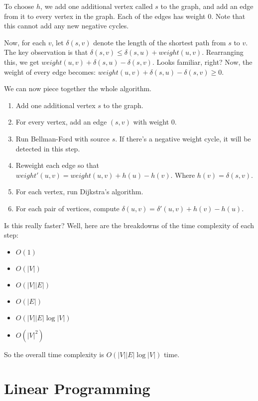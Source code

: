 \documentclass[11pt,fleqn,a4paper,titlepage,dvipsnames,cmyk]{scrartcl}
\begin{document}
To choose $h$, we add one additional vertex called $s$ to the graph, and
add an edge from it to every vertex in the graph. Each of the edges has
weight 0. Note that this cannot add any new negative cycles.

Now, for each $v$, let $\delta(s,v)$ denote the length of the shortest
path from $s$ to $v$. The key observation is that $\delta(s,v) \le
\delta(s,u) + weight(u,v)$. Rearranging this, we get $weight(u,v) +
\delta(s,u) - \delta(s,v)$. Looks familiar, right? Now, the weight of
every edge becomes: $weight(u,v) + \delta(s,u) - \delta(s,v) \ge 0$.

We can now piece together the whole algorithm.

\begin{enumerate}
    \item Add one additional vertex $s$ to the graph.
    \item For every vertex, add an edge $(s,v)$ with weight 0.
    \item Run Bellman-Ford with source $s$. If there's a negative weight
        cycle, it will be detected in this step.
    \item Reweight each edge so that $weight'(u,v) = weight(u,v) + h(u) -
        h(v)$. Where $h(v) = \delta(s,v)$.
    \item For each vertex, run Dijkstra's algorithm.
    \item For each pair of vertices, compute $\delta(u,v) = \delta'(u,v) +
        h(v) - h(u)$.
\end{enumerate}

Is this really faster? Well, here are the breakdowns of the time
complexity of each step:

\begin{itemize}
    \item $O(1)$
    \item $O(|V|)$
    \item $O(|V||E|)$
    \item $O(|E|)$
    \item $O(|V||E|\log|V|)$
    \item $O(|V|^2)$
\end{itemize}

So the overall time complexity is $O(|V||E|\log|V|)$ time.



\section{Linear Programming}%
\label{sec:LP}
\end{document}
